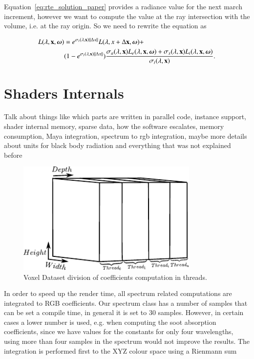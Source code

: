 Equation~\ref{eq:rte_solution_paper} provides a radiance value for the next march increment, however we want to compute the value at the ray intersection with the volume, i.e. at the ray origin.
So we need to rewrite the equation as

\begin{equation}
\begin{split}
L(\lambda, \mathbf{x}, \boldsymbol{\omega}) &= e^{\sigma_t(\lambda, \mathbf{x}) \left \| \Delta x \right \|} L(\lambda, x + \Delta\mathbf{x}, \boldsymbol{\omega}) +  \\
& (1 - e^{\sigma_t(\lambda, \mathbf{x}) \left \| \Delta x \right \|} ) \frac{\sigma_a(\lambda, \mathbf{x}) L_e(\lambda, \mathbf{x}, \boldsymbol{\omega}) + \sigma_s(\lambda, \mathbf{x}) L_i(\lambda, \mathbf{x}, \boldsymbol{\omega})}{\sigma_t(\lambda, \mathbf{x})}.
\end{split}
\end{equation}

\section{Shaders Internals}
\label{sec:shaders_internals}

Talk about things like which parts are written in parallel code, instance support, shader internal memory, sparse data, how the software escalates, memory consumption, Maya integration, spectrum to rgb integration, maybe more details about units for black body radiation and everything that was not explained before

\begin{figure}[htbp!]
\centering
\includegraphics[width=0.8\textwidth]{img/voxel_thread_division}
	\caption{Voxel Dataset division of coefficients computation in threads.}
	\label{fig:voxel_dataset_threaded}
\end{figure}

In order to speed up the render time, all spectrum related computations are integrated to RGB coefficients.
Our spectrum class has a number of samples that can be set a compile time, in general it is set to 30 samples.
However, in certain cases a lower number is used, e.g. when computing the soot absorption coefficients, since we have values for the constants for only four wavelengths, using more than four samples in the spectrum would not improve the results.
The integration is performed first to the XYZ colour space using a Rienmann sum

